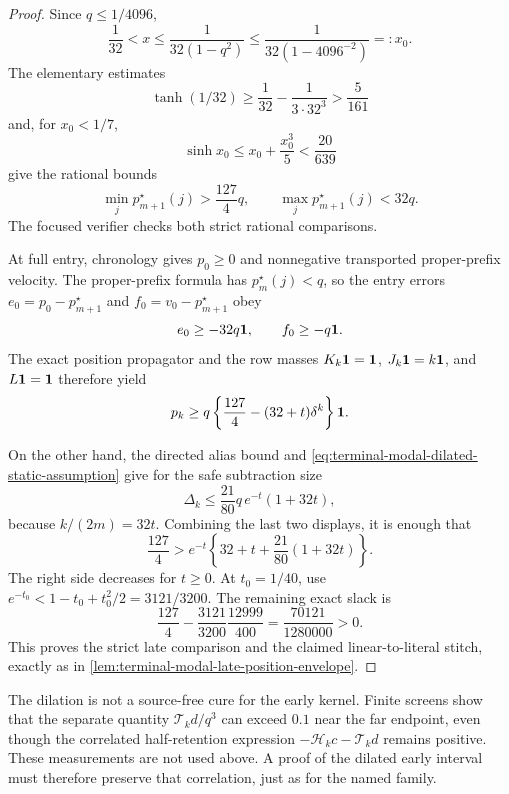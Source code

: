 \begin{proof}
Since $q\le1/4096$,
\[
 \frac1{32}<x\le\frac1{32(1-q^2)}
 \le\frac1{32(1-4096^{-2})}=:x_0.
\]
The elementary estimates
\[
 \tanh(1/32)\ge\frac1{32}-\frac1{3\cdot32^3}>\frac5{161}
\]
and, for $x_0<1/7$,
\[
 \sinh x_0\le x_0+\frac{x_0^3}{5}<\frac{20}{639}
\]
give the rational bounds
\begin{equation}
 \min_jp_{m+1}^\star(j)>\frac{127}{4}q,
 \qquad
 \max_jp_{m+1}^\star(j)<32q.
 \label{eq:terminal-modal-dilated-optimum-bounds}
\end{equation}
The focused verifier checks both strict rational comparisons.

At full entry, chronology gives $p_0\ge0$ and nonnegative transported
proper-prefix velocity.  The proper-prefix formula has
$p_m^\star(j)<q$, so the entry errors
$e_0=p_0-p_{m+1}^\star$ and $f_0=v_0-p_{m+1}^\star$ obey
\[
 e_0\ge-32q\mathbf{1},\qquad f_0\ge-q\mathbf{1}.
\]
The exact position propagator and the row masses
$K_k\mathbf{1}=\mathbf{1}$, $J_k\mathbf{1}=k\mathbf{1}$, and $L\mathbf{1}=\mathbf{1}$ therefore yield
\begin{equation}
 p_k\ge q\left\{\frac{127}{4}-(32+t)\delta^k\right\}\mathbf{1}.
 \label{eq:terminal-modal-dilated-position-lower}
\end{equation}

On the other hand, the directed alias bound and
\eqref{eq:terminal-modal-dilated-static-assumption} give for the safe
subtraction size
\begin{equation}
 \Delta_k\le\frac{21}{80}q\,e^{-t}(1+32t),
 \label{eq:terminal-modal-dilated-envelope-upper}
\end{equation}
because $k/(2m)=32t$.  Combining the last two displays, it is enough that
\begin{equation}
 \frac{127}{4}>
 e^{-t}\left\{32+t+\frac{21}{80}(1+32t)\right\}.
 \label{eq:terminal-modal-dilated-scalar-comparison}
\end{equation}
The right side decreases for $t\ge0$.  At $t_0=1/40$, use
$e^{-t_0}<1-t_0+t_0^2/2=3121/3200$.  The remaining exact slack is
\begin{equation}
 \frac{127}{4}-\frac{3121}{3200}\frac{12999}{400}
 =\frac{70121}{1280000}>0.
\end{equation}
This proves the strict late comparison and the claimed linear-to-literal
stitch, exactly as in
\cref{lem:terminal-modal-late-position-envelope}.
\end{proof}

The dilation is not a source-free cure for the early kernel.  Finite screens
show that the separate quantity $\mathcal T_kd/q^3$ can exceed $0.1$ near
the far endpoint, even though the correlated half-retention expression
$-\mathcal H_kc-\mathcal T_kd$ remains positive.  These measurements are not
used above.  A proof of the dilated early interval must therefore preserve
that correlation, just as for the named family.
